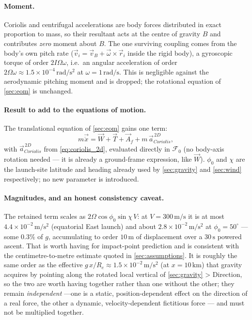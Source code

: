 \paragraph{Moment.} Coriolis and centrifugal accelerations are body forces distributed in exact
proportion to mass, so their resultant acts at the centre of gravity $B$ and contributes
\emph{zero} moment about $B$. The one surviving coupling comes from the body's own pitch rate
($\vec{v}_i=\vec{v}_B+\vec{\omega}\times\vec{r}_i$ inside the rigid body), a gyroscopic torque of
order $2I\Omega\omega$, i.e.\ an angular acceleration of order $2\Omega\omega\approx
1.5\times10^{-4}\,\mathrm{rad/s^2}$ at $\omega=1\,\mathrm{rad/s}$. This is negligible against the
aerodynamic pitching moment and is dropped; the rotational equation of \autoref{sec:eom} is
unchanged.

\paragraph{Result to add to the equations of motion.} The translational equation of
\autoref{sec:eom} gains one term:
\begin{equation}
    m\vec{\ddot{x}} = \vec{W} + \vec{T} + \vec{A}_f + m\,\vec{a}_{Coriolis}^{\,2D},
\end{equation}
with $\vec{a}_{Coriolis}^{\,2D}$ from \autoref{eq:coriolis_2d}, evaluated directly in
$\mathcal{F}_0$ (no body-axis rotation needed --- it is already a ground-frame expression, like
$\vec{W}$). $\phi_0$ and $\chi$ are the launch-site latitude and heading already used by
\autoref{sec:gravity} and \autoref{sec:wind} respectively; no new parameter is introduced.

\paragraph{Magnitudes, and an honest consistency caveat.} The retained term scales as
$2\Omega\cos\phi_0\sin\chi\,V$: at $V=300\,\mathrm{m/s}$ it is at most
$4.4\times10^{-2}\,\mathrm{m/s^2}$ (equatorial East launch) and about
$2.8\times10^{-2}\,\mathrm{m/s^2}$ at $\phi_0=50^\circ$ --- some $0.3\%$ of $g$, accumulating to
order $10\,\mathrm{m}$ of displacement over a $30\,\mathrm{s}$ powered ascent. That is worth
having for impact-point prediction and is consistent with the centimetre-to-metre estimate quoted
in \autoref{sec:assumptions}. It is roughly the same order as the effective
$g\,x/R_e\approx1.5\times10^{-2}\,\mathrm{m/s^2}$ (at $x=10\,\mathrm{km}$) that gravity acquires
by pointing along the rotated local vertical of \autoref{sec:gravity} > Direction, so the two are
worth having together rather than one without the other; they remain \emph{independent} ---one is
a static, position-dependent effect on the direction of a real force, the other a dynamic,
velocity-dependent fictitious force --- and must not be multiplied together.

